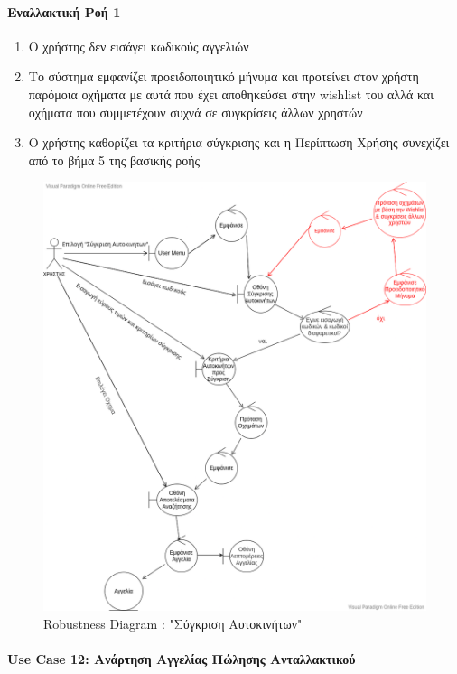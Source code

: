 \documentclass{../ol-softwaremanual}
\begin{document}
	\paragraph{Εναλλακτική Ροή 1}
	
	\begin{enumerate}
		\item Ο χρήστης δεν εισάγει κωδικούς αγγελιών
		\item Το σύστημα εμφανίζει προειδοποιητικό μήνυμα και προτείνει στον χρήστη παρόμοια οχήματα με αυτά που έχει αποθηκεύσει στην \en wishlist \gr του αλλά και οχήματα που συμμετέχουν συχνά σε συγκρίσεις άλλων χρηστών
		\item Ο χρήστης καθορίζει τα κριτήρια σύγκρισης και η Περίπτωση Χρήσης συνεχίζει από το βήμα 5 της βασικής ροής
	\end{enumerate}
	
	\begin{figure}[htbp!]
		\includegraphics[scale=0.45]{img/rob_vehicle_compare.png}
		\caption{\en Robustness Diagram : "\gr Σύγκριση Αυτοκινήτων\en"\gr}
	\end{figure}
	
	\newpage
	
	\centering
	\paragraph{\en Use Case 12: \gr Ανάρτηση Αγγελίας Πώλησης Ανταλλακτικού \gr}
	
\end{document}
